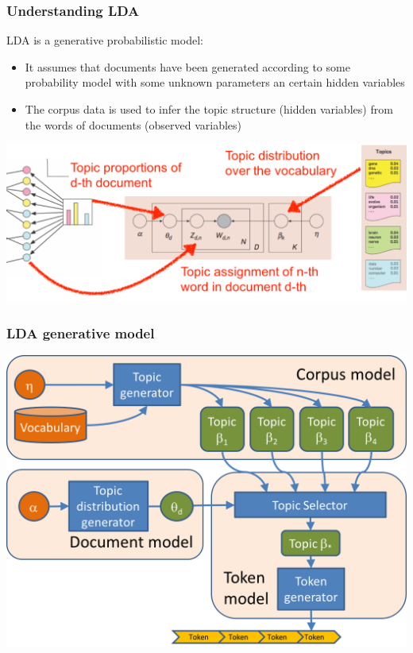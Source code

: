 \documentclass{beamer}
\begin{document}
\begin{frame}

    \frametitle{Understanding LDA}

	LDA is a generative probabilistic model: 
	\begin{itemize}
	\item It assumes that documents have been generated according to some probability model with some unknown parameters an certain hidden variables
	
	\item The corpus data is used to infer the topic structure (hidden variables) from the words of documents (observed variables)
	\end{itemize}


	\centerline{\includegraphics[width=.7\textwidth]{./figs/NLPTM_LDA2.png}}

\end{frame}


\begin{frame}

    \frametitle{LDA generative model}

	\centerline{\includegraphics[width=.9\textwidth]{./figs/NLPTM_LDA3.png}}

\end{frame}
\end{document}
